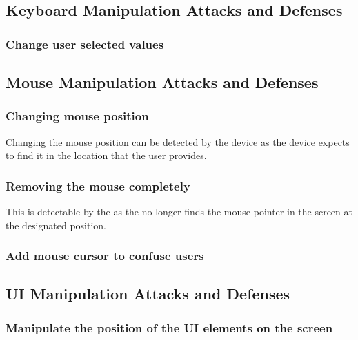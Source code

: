 \subsection{Keyboard Manipulation Attacks and Defenses}
\subsubsection{Change user selected values}


\subsection{Mouse Manipulation Attacks and Defenses}
\subsubsection{Changing mouse position}
Changing the mouse position can be detected by the device as the device expects to find it in the location that the user provides. 
\subsubsection{Removing the mouse completely}
This is detectable by the \device as the \device no longer finds the mouse pointer in the screen at the designated position.  
\subsubsection{Add mouse cursor to confuse users}

\subsection{UI Manipulation Attacks and Defenses}
\subsubsection{Manipulate the position of the UI elements on the screen}
\fi